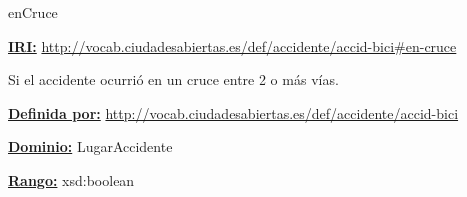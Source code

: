 \begin{mybox}{enCruce}
\begin{flushleft}
\underline{\textbf{IRI:}}
\url{http://vocab.ciudadesabiertas.es/def/accidente/accid-bici#en-cruce}
\newline

Si el accidente ocurrió en un cruce entre 2 o más vías.
\newline

\underline{\textbf{Definida por:}}
\url{http://vocab.ciudadesabiertas.es/def/accidente/accid-bici}
\newline

\underline{\textbf{Dominio:}} 
	LugarAccidente
\newline

\underline{\textbf{Rango:}}
	xsd:boolean

\end{flushleft}
\end{mybox}
































